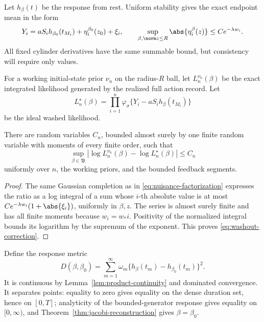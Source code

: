 Let \(h_\beta(t)\) be the response from rest.  Uniform stability gives the
exact endpoint mean in the form
\begin{equation}
 Y_i=aS_ih_{\beta_0}(t_{M_i})+\eta_i^{\beta_0}(z_0)+\xi_i,
 \qquad
 \sup_{\beta,\norm z\le R}\abs{\eta_i^\beta(z)}
 \le Ce^{-\lambda w_i}.
 \label{eq:washed-observation}
\end{equation}
All fixed cylinder derivatives have the same summable bound, but consistency
will require only values.

For a working initial-state prior \(\nu_n\) on the radius-\(R\) ball, let
\(L_n^{\nu_n}(\beta)\) be the exact integrated likelihood generated by the
realized full action record.  Let
\[
 L_n^\star(\beta)=
 \prod_{i=1}^n
 \varphi_\sigma\{Y_i-aS_ih_\beta(t_{M_i})\}
\]
be the ideal washed likelihood.

\begin{lemma}
\label{lem:washout-correction}
There are random variables \(C_n\), bounded almost surely by one finite random
variable with moments of every finite order, such that
\begin{equation}
 \sup_{\beta\in\mathfrak B}
 \left|\log L_n^{\nu_n}(\beta)-\log L_n^\star(\beta)\right|
 \le C_n
 \label{eq:washout-correction}
\end{equation}
uniformly over \(n\), the working priors, and the bounded feedback segments.
\end{lemma}

\begin{proof}
The same Gaussian completion as in \eqref{eq:nuisance-factorization}
expresses the ratio as a log integral of a sum whose \(i\)-th absolute value
is at most
\(Ce^{-\lambda w_i}(1+\abs{\xi_i})\), uniformly in \(\beta,z\).  The series
is almost surely finite and has all finite moments because
\(w_i=w_*i\).  Positivity of the normalized integral bounds its logarithm by
the supremum of the exponent.  This proves \eqref{eq:washout-correction}.
\end{proof}

Define the response metric
\begin{equation}
 D(\beta,\beta_0)=
 \sum_{m=1}^\infty\omega_m
 \{h_\beta(t_m)-h_{\beta_0}(t_m)\}^2.
 \label{eq:response-metric}
\end{equation}
It is continuous by Lemma~\ref{lem:product-continuity} and dominated
convergence.  It separates points: equality to zero gives equality on the
dense duration set, hence on \([0,T]\); analyticity of the bounded-generator
response gives equality on \([0,\infty)\), and
Theorem~\ref{thm:jacobi-reconstruction} gives \(\beta=\beta_0\).

